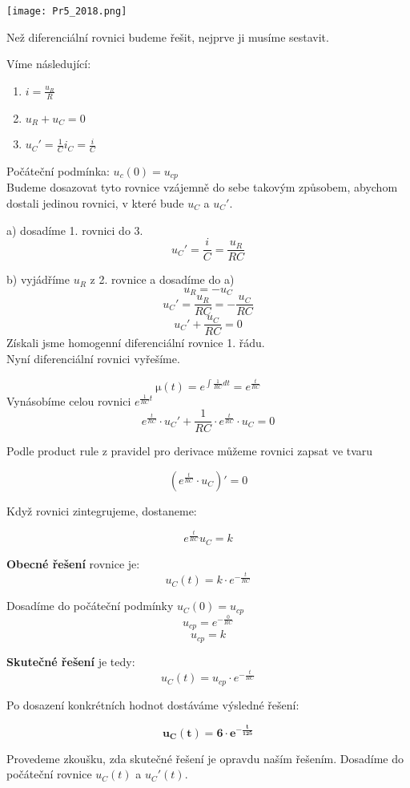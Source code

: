 \documentclass[11pt]{article}
\begin{document}
\begin{center}
	\texttt{[image: Pr5\_2018.png]} 
\end{center}

Než diferenciální rovnici budeme řešit, nejprve ji musíme sestavit. 

Víme následující:
\begin{enumerate}
	\item \( i = \frac{u_R}{R} \)
	\item \( u_R + u_C = 0 \)
	\item \( u_C' = \frac{1}{C}i_C = \frac{i}{C} \)
\end{enumerate}

Počáteční podmínka: \( u_c(0) = u_{cp} \)
\\

Budeme dosazovat tyto rovnice vzájemně do sebe takovým způsobem, abychom dostali jedinou rovnici, v které bude \(u_C\) a \(u_C'\).

a) dosadíme 1. rovnici do 3.
\[ u_C' = \frac{i}{C} = \frac{u_R}{RC} \]

b) vyjádříme \( u_R \) z 2. rovnice a dosadíme do a)
\[ u_R = -u_C \]
\[ u_C' = \frac{u_R}{RC} = -\frac{u_C}{RC} \]
\[ u_C' + \frac{u_C}{RC} = 0\] 
Získali jsme homogenní diferenciální rovnice 1. řádu.
\\
Nyní diferenciální rovnici vyřešíme.

$$ \si{\micro}(t) = e^{\int\frac{1}{RC} dt} = e^{\frac{t}{RC}} $$
Vynásobíme celou rovnici $ e^{\frac{1}{RC}t} $
$$ e^{\frac{t}{RC}} \cdot u_C' + \frac{1}{RC} \cdot e^{\frac{t}{RC}} \cdot u_C = 0  $$

Podle product rule z pravidel pro derivace můžeme rovnici zapsat ve tvaru

$$ (e^{\frac{t}{RC}} \cdot u_C)' = 0 $$

Když rovnici zintegrujeme, dostaneme:

$$ e^{\frac{t}{RC}} u_C = k $$

\textbf{Obecné řešení} rovnice je:
$$ u_C(t) = k \cdot e^{-\frac{t}{RC}} $$

Dosadíme do počáteční podmínky $ u_C(0) = u_{cp} $
$$ u_{cp} = e^{-\frac{0}{RC}} $$
$$ u_{cp} = k $$

\textbf{Skutečné řešení} je tedy: 
$$ u_C(t) = u_{cp} \cdot e^{-\frac{t}{RC}} $$

Po dosazení konkrétních hodnot dostáváme výsledné řešení:

$$ \mathbold{u_C(t) = 6\cdot e^{-\frac{t}{125}}} $$

Provedeme zkoušku, zda skutečné řešení je opravdu naším řešením. 
Dosadíme do počáteční rovnice $ u_C(t) $ a $ u_C'(t) $.
\end{document}
